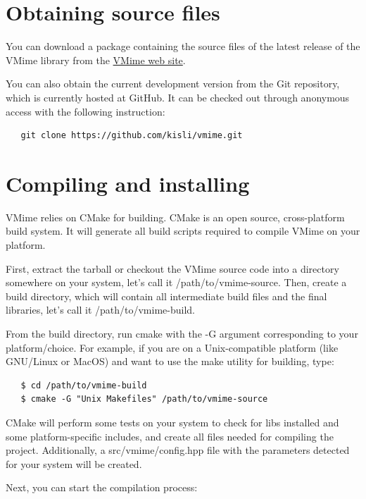 \section{Obtaining source files}

You can download a package containing the source files of the latest release
of the VMime library from the \href{http://www.vmime.org/}{VMime web site}.

You can also obtain the current development version from the Git repository,
which is currently hosted at GitHub. It can be checked out through anonymous
access with the following instruction:

\begin{verbatim}
   git clone https://github.com/kisli/vmime.git
\end{verbatim}

\section{Compiling and installing}

VMime relies on CMake for building. CMake is an open source, cross-platform
build system. It will generate all build scripts required to compile VMime on
your platform.

First, extract the tarball or checkout the VMime source code into a directory
somewhere on your system, let's call it {\vcode /path/to/vmime-source}. Then,
create a build directory, which will contain all intermediate build files and
the final libraries, let's call it {\vcode /path/to/vmime-build}.

From the build directory, run {\vcode cmake} with the {\vcode -G} argument
corresponding to your platform/choice. For example, if you are on a
Unix-compatible platform (like GNU/Linux or MacOS) and want to use the
{\vcode make} utility for building, type:

\begin{verbatim}
   $ cd /path/to/vmime-build
   $ cmake -G "Unix Makefiles" /path/to/vmime-source
\end{verbatim}

CMake will perform some tests on your system to check for libs installed
and some platform-specific includes, and create all files needed for
compiling the project. Additionally, a {\vcode src/vmime/config.hpp} file
with the parameters detected for your system will be created.

Next, you can start the compilation process:

